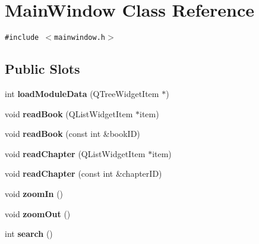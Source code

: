 \hypertarget{classMainWindow}{
\section{MainWindow Class Reference}
\label{classMainWindow}
}
{\tt \#include $<$mainwindow.h$>$}

\subsection*{Public Slots}
\begin{CompactItemize}
\item 
\hypertarget{classMainWindow_f0cf4504a5eeee0025a717d5c4f01d9f}{
int \textbf{loadModuleData} (QTreeWidgetItem $\ast$)}
\label{classMainWindow_f0cf4504a5eeee0025a717d5c4f01d9f}

\item 
\hypertarget{classMainWindow_dbdd825b4370544222644ce421718b4f}{
void \textbf{readBook} (QListWidgetItem $\ast$item)}
\label{classMainWindow_dbdd825b4370544222644ce421718b4f}

\item 
\hypertarget{classMainWindow_9c0d0fda838420ef188dcc955b6a2800}{
void \textbf{readBook} (const int \&bookID)}
\label{classMainWindow_9c0d0fda838420ef188dcc955b6a2800}

\item 
\hypertarget{classMainWindow_be40529c6b405be7ffe14abd4619ba02}{
void \textbf{readChapter} (QListWidgetItem $\ast$item)}
\label{classMainWindow_be40529c6b405be7ffe14abd4619ba02}

\item 
\hypertarget{classMainWindow_882627a450b87489a007603bd12a9766}{
void \textbf{readChapter} (const int \&chapterID)}
\label{classMainWindow_882627a450b87489a007603bd12a9766}

\item 
\hypertarget{classMainWindow_a13e39ece777521d3f176155899309a6}{
void \textbf{zoomIn} ()}
\label{classMainWindow_a13e39ece777521d3f176155899309a6}

\item 
\hypertarget{classMainWindow_21d4700dd4bc51216443a4c788b85892}{
void \textbf{zoomOut} ()}
\label{classMainWindow_21d4700dd4bc51216443a4c788b85892}

\item 
\hypertarget{classMainWindow_0f32ac43801cfac2b845063b54a0ece2}{
int \textbf{search} ()}
\label{classMainWindow_0f32ac43801cfac2b845063b54a0ece2}


\end{CompactItemize}
